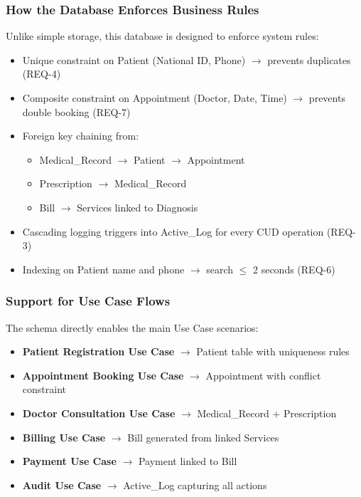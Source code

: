 \subsubsection{How the Database Enforces Business Rules}
Unlike simple storage, this database is designed to enforce system rules:
\begin{itemize}
	\item Unique constraint on Patient (National ID, Phone) $\rightarrow$ prevents duplicates (REQ-4)
	\item Composite constraint on Appointment (Doctor, Date, Time) $\rightarrow$ prevents double booking (REQ-7)
	\item Foreign key chaining from:
	\begin{itemize}
		\item Medical\_Record $\rightarrow$ Patient $\rightarrow$ Appointment
		\item Prescription $\rightarrow$ Medical\_Record
		\item Bill $\rightarrow$ Services linked to Diagnosis
	\end{itemize}
	\item Cascading logging triggers into Active\_Log for every CUD operation (REQ-3)
	\item Indexing on Patient name and phone $\rightarrow$ search \(\leq\) 2 seconds (REQ-6)
\end{itemize}

\subsubsection{Support for Use Case Flows}
The schema directly enables the main Use Case scenarios:
\begin{itemize}
	\item \textbf{Patient Registration Use Case} $\rightarrow$ Patient table with uniqueness rules
	\item \textbf{Appointment Booking Use Case} $\rightarrow$ Appointment with conflict constraint
	\item \textbf{Doctor Consultation Use Case} $\rightarrow$ Medical\_Record + Prescription
	\item \textbf{Billing Use Case} $\rightarrow$ Bill generated from linked Services
	\item \textbf{Payment Use Case} $\rightarrow$ Payment linked to Bill
	\item \textbf{Audit Use Case} $\rightarrow$ Active\_Log capturing all actions
\end{itemize}

